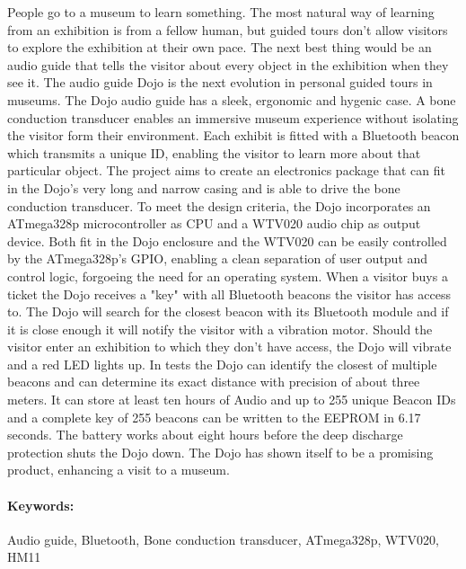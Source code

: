 %
%
%
%
%
%

People go to a museum to learn something.
The most natural way of learning from an exhibition is from a fellow human, but guided tours don't allow visitors to explore the exhibition at their own pace.
The next best thing would be an audio guide that tells the visitor about every object in the exhibition when they see it.
The audio guide Dojo is the next evolution in personal guided tours in museums.
The Dojo audio guide has a sleek, ergonomic and hygenic case.
A bone conduction transducer enables an immersive museum experience without isolating the visitor form their environment.
Each exhibit is fitted with a Bluetooth beacon which transmits a unique ID, enabling the visitor to learn more about that particular object.
The project aims to create an electronics package that can fit in the Dojo's very long and narrow casing and is able to drive the bone conduction transducer.
To meet the design criteria, the Dojo incorporates an ATmega328p microcontroller as CPU and a WTV020 audio chip as output device.
Both fit in the Dojo enclosure and the WTV020 can be easily controlled by the ATmega328p's GPIO, enabling a clean separation of user output and control logic, forgoeing the need for an operating system.
When a visitor buys a ticket the Dojo receives a "key" with all Bluetooth beacons the visitor has access to.
The Dojo will search for the closest beacon with its Bluetooth module and if it is close enough it will notify the visitor with a vibration motor.
Should the visitor enter an exhibition to which they don't have access, the Dojo will vibrate and a red LED lights up.
In tests the Dojo can identify the closest of multiple beacons and can determine its exact distance with precision of about three meters.
It can store at least ten hours of Audio and up to 255 unique Beacon IDs and a complete key of 255 beacons can be written to the EEPROM in 6.17 seconds.
The battery works about eight hours before the deep discharge protection shuts the Dojo down.
The Dojo has shown itself to be a promising product, enhancing a visit to a museum.

\paragraph{Keywords:} Audio guide, Bluetooth, Bone conduction transducer, ATmega328p, WTV020, HM11

%

